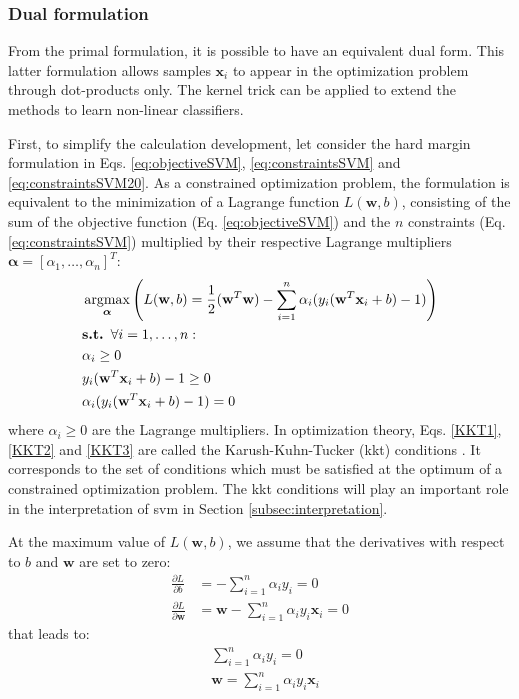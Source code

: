 \subsubsection{Dual formulation}
\label{sec:dualSVM}
From the primal formulation, it is possible to have an equivalent dual form. This latter formulation allows samples $\textbf{x}_i$ to appear in the optimization problem through dot-products only. The kernel trick can be applied to extend the methods to learn non-linear classifiers.

First, to simplify the calculation development, let consider the hard margin formulation in Eqs. \ref{eq:objectiveSVM}, \ref{eq:constraintsSVM} and \ref{eq:constraintsSVM20}. As a constrained optimization problem, the formulation is equivalent to the minimization of a Lagrange function $L(\textbf{w},b)$, consisting of the sum of the objective function (Eq. \ref{eq:objectiveSVM}) and the $n$ constraints (Eq. \ref{eq:constraintsSVM}) multiplied by their respective Lagrange multipliers $\boldsymbol{\alpha} = [\alpha_1, \ldots, \alpha_n]^T$: 
\begin{align}
	& \argmax_{\boldsymbol{\alpha}} \left( L(\textbf{w},b) = \frac{1}{2}(\textbf{w}^T\textbf{w})-\sum\limits_{i=1}^{n}\alpha_i(y_i(\textbf{w}^T\textbf{x}_i+b)-1) \right) \label{eq:Lagrange} \\
	& \textbf{s.t. } \forall i = 1,\ldots,n: \nonumber \\
	& \alpha_i \geq 0 \label{KKT1}\\
	& y_i(\textbf{w}^T\textbf{x}_i+b)-1 \geq 0 \label{KKT2}\\
	& \alpha_i (y_i(\textbf{w}^T\textbf{x}_i+b)-1) = 0 \label{KKT3}
\end{align}
\noindent where $\alpha_i \geq 0$ are the Lagrange multipliers. In optimization theory, Eqs. \ref{KKT1}, \ref{KKT2} and \ref{KKT3} are called the Karush-Kuhn-Tucker ({\sc kkt}) conditions \cite{Bishop2006}. It corresponds to the set of conditions which must be satisfied at the optimum of a constrained optimization problem. The {\sc kkt} conditions will play an important role in the interpretation of {\sc svm} in Section \ref{subsec:interpretation}. 

\noindent At the maximum value of $L(\textbf{w},b)$, we assume that the derivatives with respect to $b$ and $\textbf{w}$ are set to zero:
\begin{align*}
\frac{\partial L}{\partial b} &= - \sum\limits_{i=1}^{n}\alpha_i y_i = 0 \\
\frac{\partial L}{\partial \textbf{w}} &= \textbf{w}-\sum\limits_{i=1}^{n}\alpha_i y_i \textbf{x}_i = 0
\end{align*}
\noindent that leads to:
\begin{align}
&\sum\limits_{i=1}^{n}\alpha_i y_i = 0 \\
& \textbf{w} = \sum\limits_{i=1}^{n}\alpha_i y_i \textbf{x}_i
\end{align}

